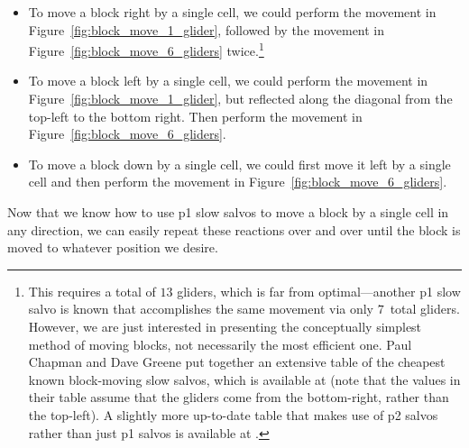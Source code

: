 \begin{itemize}
	\item To move a block right by a single cell, we could perform the movement in Figure~\ref{fig:block_move_1_glider}, followed by the movement in Figure~\ref{fig:block_move_6_gliders} twice.\footnote{This requires a total of $13$ gliders, which is far from optimal---another p1 slow salvo is known that accomplishes the same movement via only $7$~total gliders. However, we are just interested in presenting the conceptually simplest method of moving blocks, not necessarily the most efficient one. Paul Chapman and Dave Greene put together an extensive table of the cheapest known block-moving slow salvos, which is available at  (note that the values in their table assume that the gliders come from the bottom-right, rather than the top-left). A slightly more up-to-date table that makes use of p2 salvos rather than just p1 salvos is available at .}\smallskip
	
	\item To move a block left by a single cell, we could perform the movement in Figure~\ref{fig:block_move_1_glider}, but reflected along the diagonal from the top-left to the bottom right. Then perform the movement in Figure~\ref{fig:block_move_6_gliders}.\smallskip
	
	\item To move a block down by a single cell, we could first move it left by a single cell and then perform the movement in Figure~\ref{fig:block_move_6_gliders}.\smallskip
\end{itemize}

Now that we know how to use p1 slow salvos to move a block by a single cell in any direction, we can easily repeat these reactions over and over until the block is moved to whatever position we desire.%



